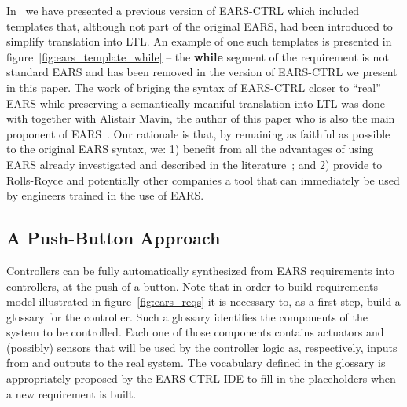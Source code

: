 In~\cite{LucioRCM17} we have presented a previous version of \textsf{EARS-CTRL}
which included templates that, although not part of the original EARS, had been
introduced to simplify translation into LTL.  An example of one such templates
is presented in figure~\ref{fig:ears_template_while} -- the \textbf{while} segment of the
requirement is not standard EARS and has been removed in the version of
\textsf{EARS-CTRL} we present in this paper. The work of briging the syntax of
\textsf{EARS-CTRL} closer to ``real'' EARS while preserving a semantically
meaniful translation into LTL was done with together with Alistair Mavin, the
author of this paper who is also the main proponent of EARS~\cite{EARS09}.
Our rationale is that, by remaining as faithful as possible to the original
EARS syntax, we: 1) benefit from all the advantages of using EARS already
investigated and described in the literature~\cite{EARS09,EARS16}; and 2)
provide to Rolls-Royce and potentially other companies a tool that can
immediately be used by engineers trained in the use of EARS.


%
% 

\subsection{A Push-Button Approach}

Controllers can be fully automatically synthesized from EARS requirements into
controllers, at the push of a button. Note that in order to build requirements
model illustrated in figure~\ref{fig:ears_reqs} it is necessary to, as a first
step, build a glossary for the controller. Such a glossary identifies the
components of the system to be controlled. Each one of those components contains
actuators and (possibly) sensors that will be used by the controller logic
as, respectively, inputs from and outputs to the real system. The vocabulary
defined in the glossary is appropriately proposed by the \textsf{EARS-CTRL} IDE
to fill in the placeholders when a new requirement is built.

